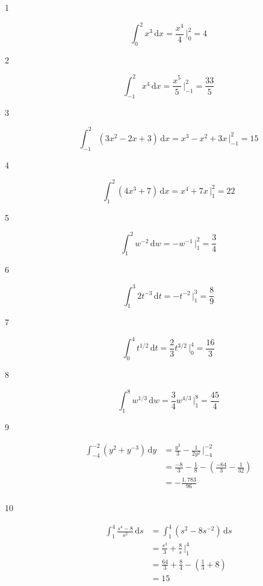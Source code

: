 \documentclass{exam}
\begin{document}
\begin{description}
\item[1]
\[
   \int_0^2 x^3 \, \mathrm{d}x = \frac{x^4}{4} \, \bigg|_0^2 = 4
\]

\item[2]
\[
   \int_{-1}^2 x^4 \, \mathrm{d}x = \frac{x^5}{5} \, \bigg|_{-1}^2 = \frac{33}{5}
\]

\item[3]
\[
   \int_{-1}^2 \left( 3x^2 - 2x + 3 \right) \, \mathrm{d}x = x^3 - x^2 + 3x \, \bigg|_{-1}^2 = 15
\]

\item[4]
\[
   \int_1^2 \left(4x^3 + 7 \right) \, \mathrm{d}x = x^4 + 7x \, \bigg|_1^2 = 22
\]

\item[5]
\[
   \int_1^2 w^{-2} \, \mathrm{d}w = -w^{-1} \, \bigg|_1^2 = \frac{3}{4}
\]

\item[6]
\[
   \int_1^3 2t^{-3} \, \mathrm{d}t = -t^{-2} \, \bigg|_1^3 = \frac{8}{9}
\]

\item[7]
\[
   \int_0^4 t^{1/2} \, \mathrm{d}t = \frac{2}{3} t^{3/2} \, \bigg|_0^4 = \frac{16}{3}
\]

\item[8]
\[
   \int_1^8 w^{1/3} \, \mathrm{d}w = \frac{3}{4} w^{4/3} \, \bigg|_1^8 = \frac{45}{4}
\]

\item[9]
\begin{align*}
  \int_{-4}^{-2} \left(y^2 + y^{-3} \right) \, \mathrm{d}y &= \frac{y^3}{3} - \frac{1}{2y^2} \, \bigg|_{-4}^{-2} \\
  &= \frac{-8}{3} - \frac{1}{8} - \left( \frac{-64}{3} - \frac{1}{32} \right) \\
  &= -\frac{1,783}{96} \\
\end{align*}

\item[10]
\begin{align*}
  \int_1^4 \frac{s^4 - 8}{s^2} \, \mathrm{d}s &= \int_1^4 \left( s^2 - 8s^{-2} \right) \, \mathrm{d}s \\
  &= \frac{s^3}{3} + \frac{8}{s} \, \bigg|_1^4 \\
  &= \frac{64}{3} + \frac{8}{4} - \left( \frac{1}{3} + 8 \right) \\
  &= 15 \\
\end{align*}


\end{description}
\end{document}
